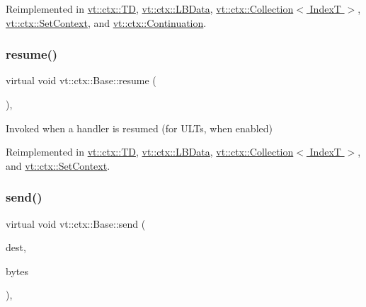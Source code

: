 Reimplemented in \hyperlink{structvt_1_1ctx_1_1_t_d_a5131b9af6b389c90c1ac908c7dcc59b9}{vt\+::ctx\+::\+TD}, \hyperlink{structvt_1_1ctx_1_1_l_b_data_a1a3b7728a5b9948183136c1ccec42d41}{vt\+::ctx\+::\+L\+B\+Data}, \hyperlink{structvt_1_1ctx_1_1_collection_afbbbbaa3a85469b7ddded1ded70bd83d}{vt\+::ctx\+::\+Collection$<$ Index\+T $>$}, \hyperlink{structvt_1_1ctx_1_1_set_context_a17029268846a24e61fa35339e9bdcc10}{vt\+::ctx\+::\+Set\+Context}, and \hyperlink{structvt_1_1ctx_1_1_continuation_aab0f231b54f257740a902a6b3258a33a}{vt\+::ctx\+::\+Continuation}.

\mbox{\label{structvt_1_1ctx_1_1_base_a303afabb40ed83057fbe30c744db95da}} 
\subsubsection{\texorpdfstring{resume()}{resume()}}
{\footnotesize\ttfamily virtual void vt\+::ctx\+::\+Base\+::resume (\begin{DoxyParamCaption}{ }\end{DoxyParamCaption})\hspace{0.3cm}{\ttfamily [inline]}, {\ttfamily [virtual]}}



Invoked when a handler is resumed (for U\+L\+Ts, when enabled) 



Reimplemented in \hyperlink{structvt_1_1ctx_1_1_t_d_aa21b5afe01312244e338eefecde83bc6}{vt\+::ctx\+::\+TD}, \hyperlink{structvt_1_1ctx_1_1_l_b_data_a6910cc378cef1690e61fbbb97dc1524c}{vt\+::ctx\+::\+L\+B\+Data}, \hyperlink{structvt_1_1ctx_1_1_collection_a4cf87cf7d38bd8d4706ffda41e31c9c6}{vt\+::ctx\+::\+Collection$<$ Index\+T $>$}, and \hyperlink{structvt_1_1ctx_1_1_set_context_a5d0e979f3d601900223d0db9bb8992d3}{vt\+::ctx\+::\+Set\+Context}.

\mbox{\label{structvt_1_1ctx_1_1_base_a8b641dd9a36fc6b60a6ac35e0126076d}} 
\subsubsection{\texorpdfstring{send()}{send()}}
{\footnotesize\ttfamily virtual void vt\+::ctx\+::\+Base\+::send (\begin{DoxyParamCaption}\item[{\hyperlink{structvt_1_1elm_1_1_element_i_d_struct}{elm\+::\+Element\+I\+D\+Struct}}]{dest,  }\item[{\hyperlink{namespacevt_a408e86a8c7c89309b52907dc5a513924}{Msg\+Size\+Type}}]{bytes }\end{DoxyParamCaption})\hspace{0.3cm}{\ttfamily [inline]}, {\ttfamily [virtual]}}



